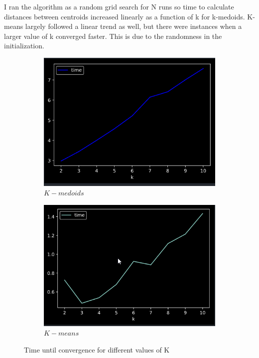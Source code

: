 \documentclass[a4paper]{article}
\begin{document}
I ran the algorithm as a random grid search for N runs so time to calculate distances between centroids increased linearly as a function of k for k-medoids.  K-means largely
followed a linear trend as well, but there were instances when a larger value of k converged faster.  This is due to the randomness in the initialization. 

 	\begin{figure}[h]
		
    \centering
    \begin{subfigure}[b]{0.3\textwidth}
        \includegraphics[width=\textwidth]{kmedoids_time.png}
        \caption{$K-medoids$}
        \label{fig:k_medoids_time}
    \end{subfigure}
    \begin{subfigure}[b]{0.3\textwidth}
        \includegraphics[width=\textwidth]{kmeans_time.png}
        \caption{$K-means$}
        \label{fig:k_means_time}
    \end{subfigure}
    \caption{Time until convergence for different values of K}\label{fig1}
\end{figure}
\end{document}
